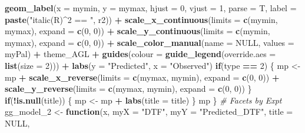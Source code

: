 \documentclass[
]{article}
\newenvironment{Shaded}{\begin{snugshade}}{\end{snugshade}}
\newcommand{\CommentTok}[1]{\textcolor[rgb]{0.56,0.35,0.01}{\textit{#1}}}
\newcommand{\ControlFlowTok}[1]{\textcolor[rgb]{0.13,0.29,0.53}{\textbf{#1}}}
\newcommand{\DataTypeTok}[1]{\textcolor[rgb]{0.13,0.29,0.53}{#1}}
\newcommand{\DecValTok}[1]{\textcolor[rgb]{0.00,0.00,0.81}{#1}}
\newcommand{\KeywordTok}[1]{\textcolor[rgb]{0.13,0.29,0.53}{\textbf{#1}}}
\newcommand{\NormalTok}[1]{#1}
\newcommand{\OperatorTok}[1]{\textcolor[rgb]{0.81,0.36,0.00}{\textbf{#1}}}
\newcommand{\OtherTok}[1]{\textcolor[rgb]{0.56,0.35,0.01}{#1}}
\newcommand{\StringTok}[1]{\textcolor[rgb]{0.31,0.60,0.02}{#1}}
\begin{document}
\begin{Shaded}
\begin{Highlighting}[]
{{{{\StringTok{    }\KeywordTok{geom_label}\NormalTok{(}\DataTypeTok{x =}\NormalTok{ mymin, }\DataTypeTok{y =}\NormalTok{ mymax, }\DataTypeTok{hjust =} \DecValTok{0}\NormalTok{, }\DataTypeTok{vjust =} \DecValTok{1}\NormalTok{, }\DataTypeTok{parse =}\NormalTok{ T,}
               \DataTypeTok{label =} \KeywordTok{paste}\NormalTok{(}\StringTok{"italic(R)^2 == "}\NormalTok{, r2)) }\OperatorTok{+}
\StringTok{    }\KeywordTok{scale_x_continuous}\NormalTok{(}\DataTypeTok{limits =} \KeywordTok{c}\NormalTok{(mymin, mymax), }\DataTypeTok{expand =} \KeywordTok{c}\NormalTok{(}\DecValTok{0}\NormalTok{, }\DecValTok{0}\NormalTok{)) }\OperatorTok{+}
\StringTok{    }\KeywordTok{scale_y_continuous}\NormalTok{(}\DataTypeTok{limits =} \KeywordTok{c}\NormalTok{(mymin, mymax), }\DataTypeTok{expand =} \KeywordTok{c}\NormalTok{(}\DecValTok{0}\NormalTok{, }\DecValTok{0}\NormalTok{)) }\OperatorTok{+}
\StringTok{    }\KeywordTok{scale_color_manual}\NormalTok{(}\DataTypeTok{name =} \OtherTok{NULL}\NormalTok{, }\DataTypeTok{values =}\NormalTok{ myPal) }\OperatorTok{+}
\StringTok{    }\NormalTok{theme_AGL }\OperatorTok{+}\StringTok{ }\KeywordTok{guides}\NormalTok{(}\DataTypeTok{colour =} \KeywordTok{guide_legend}\NormalTok{(}\DataTypeTok{override.aes =} \KeywordTok{list}\NormalTok{(}\DataTypeTok{size =} \DecValTok{2}\NormalTok{))) }\OperatorTok{+}
\StringTok{    }\KeywordTok{labs}\NormalTok{(}\DataTypeTok{y =} \StringTok{"Predicted"}\NormalTok{, }\DataTypeTok{x =} \StringTok{"Observed"}\NormalTok{)}
  \ControlFlowTok{if}\NormalTok{(type }\OperatorTok{==}\StringTok{ }\DecValTok{2}\NormalTok{) \{ }
\NormalTok{    mp <-}\StringTok{ }\NormalTok{mp }\OperatorTok{+}\StringTok{ }
\StringTok{      }\KeywordTok{scale_x_reverse}\NormalTok{(}\DataTypeTok{limits =} \KeywordTok{c}\NormalTok{(mymax, mymin), }\DataTypeTok{expand =} \KeywordTok{c}\NormalTok{(}\DecValTok{0}\NormalTok{, }\DecValTok{0}\NormalTok{)) }\OperatorTok{+}\StringTok{ }
\StringTok{      }\KeywordTok{scale_y_reverse}\NormalTok{(}\DataTypeTok{limits =} \KeywordTok{c}\NormalTok{(mymax, mymin), }\DataTypeTok{expand =} \KeywordTok{c}\NormalTok{(}\DecValTok{0}\NormalTok{, }\DecValTok{0}\NormalTok{)) }
\NormalTok{  \}}
  \ControlFlowTok{if}\NormalTok{(}\OperatorTok{!}\KeywordTok{is.null}\NormalTok{(title)) \{ mp <-}\StringTok{ }\NormalTok{mp }\OperatorTok{+}\StringTok{ }\KeywordTok{labs}\NormalTok{(}\DataTypeTok{title =}\NormalTok{ title) \}}
\NormalTok{  mp}
\NormalTok{\}}
\CommentTok{# Facets by Expt}
\NormalTok{gg_model_}\DecValTok{2}\NormalTok{ <-}\StringTok{ }\ControlFlowTok{function}\NormalTok{(x, }\DataTypeTok{myX =} \StringTok{"DTF"}\NormalTok{, }\DataTypeTok{myY =} \StringTok{"Predicted_DTF"}\NormalTok{, }\DataTypeTok{title =} \OtherTok{NULL}\NormalTok{,}
}}}}
\end{Highlighting}
\end{Shaded}
\end{document}
